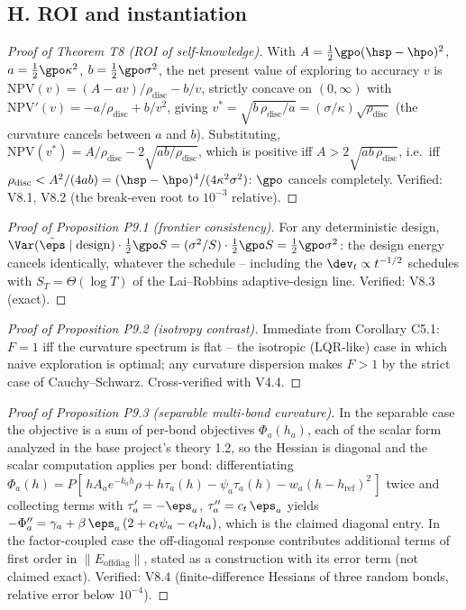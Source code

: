 \documentclass[11pt]{article}
\begin{document}
\subsection*{H. ROI and instantiation}

\begin{proof}[Proof of Theorem T8 (ROI of self-knowledge)]
With $A = \tfrac{1}{2}\gpo(\hsp - \hpo)^2$, $a = \tfrac{1}{2}\gpo\kappa^2$,
$b = \tfrac{1}{2}\gpo\sigma^2$, the net present value of exploring to
accuracy $v$ is $\mathrm{NPV}(v) = (A - a v)/\rho_{\mathrm{disc}} - b/v$,
strictly concave on $(0,\infty)$ with
$\mathrm{NPV}'(v) = -a/\rho_{\mathrm{disc}} + b/v^2$, giving
$v^* = \sqrt{b\,\rho_{\mathrm{disc}}/a} =
(\sigma/\kappa)\sqrt{\rho_{\mathrm{disc}}}$ (the curvature cancels between
$a$ and $b$). Substituting, $\mathrm{NPV}(v^*) = A/\rho_{\mathrm{disc}} -
2\sqrt{ab/\rho_{\mathrm{disc}}}$, which is positive iff
$A > 2\sqrt{a b\,\rho_{\mathrm{disc}}}$, i.e.\ iff
$\rho_{\mathrm{disc}} < A^2/(4ab) = (\hsp - \hpo)^4/(4\kappa^2\sigma^2)$:
$\gpo$ cancels completely. Verified: V8.1, V8.2 (the break-even root to
$10^{-3}$ relative).
\end{proof}

\begin{proof}[Proof of Proposition P9.1 (frontier consistency)]
For any deterministic design, $\Var(\hat\eps\mid\mathrm{design}) \cdot
\tfrac{1}{2}\gpo S = (\sigma^2/S)\cdot\tfrac{1}{2}\gpo S =
\tfrac{1}{2}\gpo\sigma^2$: the design energy cancels identically, whatever
the schedule -- including the $\dev_t \propto t^{-1/2}$ schedules with
$S_T = \Theta(\log T)$ of the Lai--Robbins adaptive-design line. Verified:
V8.3 (exact).
\end{proof}

\begin{proof}[Proof of Proposition P9.2 (isotropy contrast)]
Immediate from Corollary C5.1: $F = 1$ iff the curvature spectrum is flat
-- the isotropic (LQR-like) case in which naive exploration is optimal;
any curvature dispersion makes $F > 1$ by the strict case of
Cauchy--Schwarz. Cross-verified with V4.4.
\end{proof}

\begin{proof}[Proof of Proposition P9.3 (separable multi-bond curvature)]
In the separable case the objective is a sum of per-bond objectives
$\Phi_a(h_a)$, each of the scalar form analyzed in the base project's
theory 1.2, so the Hessian is diagonal and the scalar computation applies
per bond: differentiating $\Phi_a(h) = P[\,h A_a e^{-k_a h}\rho + h
\tau_a(h) - \psi_a \tau_a(h) - w_a (h - h_{\mathrm{ref}})^2\,]$ twice and
collecting terms with $\tau_a' = -\eps_a$, $\tau_a'' = c_t\,\eps_a$ yields
$-\Phi_a'' = \gamma_a + \beta\,\eps_a\,(2 + c_t\psi_a - c_t h_a)$, which is
the claimed diagonal entry. In the factor-coupled case the off-diagonal
response contributes additional terms of first order in
$\|E_{\mathrm{offdiag}}\|$, stated as a construction with its error term
(not claimed exact). Verified: V8.4 (finite-difference Hessians of three
random bonds, relative error below $10^{-4}$).
\end{proof}

\end{document}
